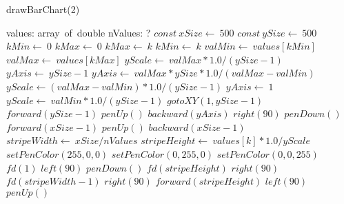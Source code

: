 \documentclass[a4paper,10pt]{article}
\begin{document}
\begin{algorithm}
\caption{drawBarChart(2)}
\begin{algorithmic}[5]
\State {}
\State {}
\State {}
\State {}
    \State values: array\ of\ double
    \State nValues: ?
  \EndDecl
  \State \(const\ xSize\gets\ 500\)
  \State \(const\ ySize\gets\ 500\)
  \State \(kMin\gets\ 0\)
  \State \(kMax\gets\ 0\)
      \State \(kMax\gets\ k\)
    \Else
        \State \(kMin\gets\ k\)
      \EndIf
    \EndIf
  \EndFor
  \State \(valMin\gets\ values[kMin]\)
  \State \(valMax\gets\ values[kMax]\)
  \State \(yScale\gets\ valMax*1.0/(ySize-1)\)
  \State \(yAxis\gets\ ySize-1\)
      \State \(yAxis\gets\ valMax*ySize*1.0/(valMax-valMin)\)
      \State \(yScale\gets(valMax-valMin)*1.0/(ySize-1)\)
    \Else
      \State \(yAxis\gets\ 1\)
      \State \(yScale\gets\ valMin*1.0/(ySize-1)\)
    \EndIf
  \EndIf
  \State \(gotoXY(1,ySize-1)\)
  \State \(forward(ySize-1)\)
  \State \(penUp()\)
  \State \(backward(yAxis)\)
  \State \(right(90)\)
  \State \(penDown()\)
  \State \(forward(xSize-1)\)
  \State \(penUp()\)
  \State \(backward(xSize-1)\)
  \State \(stripeWidth\gets\ xSize/nValues\)
    \State \(stripeHeight\gets\ values[k]*1.0/yScale\)
        \State \(setPenColor(255,0,0)\)
      \EndSelector
        \State \(setPenColor(0,255,0)\)
      \EndSelector
        \State \(setPenColor(0,0,255)\)
      \EndSelector
    \EndCase
    \State \(fd(1)\)
    \State \(left(90)\)
    \State \(penDown()\)
    \State \(fd(stripeHeight)\)
    \State \(right(90)\)
    \State \(fd(stripeWidth-1)\)
    \State \(right(90)\)
    \State \(forward(stripeHeight)\)
    \State \(left(90)\)
    \State \(penUp()\)
  \EndFor
\EndProcedure
\end{algorithmic}
\end{algorithm}
\end{document}
